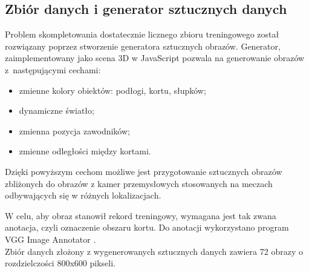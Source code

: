 \subsection{Zbiór danych i generator sztucznych danych}
\label{sec:generator}

Problem skompletowania dostatecznie licznego zbioru treningowego został rozwiązany poprzez stworzenie generatora sztucznych obrazów.
Generator, zaimplementowany jako scena 3D w JavaScript pozwala na generowanie obrazów z~następującymi cechami:

\begin{itemize}
	\item zmienne kolory obiektów: podłogi, kortu, słupków;
	\item dynamiczne światło;
	\item zmienna pozycja zawodników;
	\item zmienne odległości między kortami.
\end{itemize}

Dzięki powyższym cechom możliwe jest przygotowanie sztucznych obrazów zbliżonych do obrazów z kamer przemysłowych stosowanych na meczach odbywających się w różnych lokalizacjach.

W celu, aby obraz stanowił rekord treningowy, wymagana jest tak zwana anotacja, czyli oznaczenie obszaru kortu. Do anotacji wykorzystano program VGG Image Annotator \cite{vgg-via}.
\\
Zbiór danych złożony z wygenerowanych sztucznych danych zawiera 72 obrazy o rozdzielczości 800x600 pikseli.
